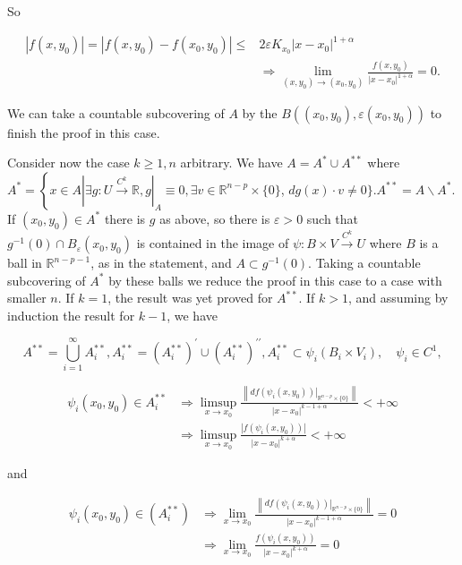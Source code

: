 \documentclass[10pt]{article}
\begin{document}
So

$$
\begin{aligned}
\left|f\left(x, y_{0}\right)\right|=\left|f\left(x, y_{0}\right)-f\left(x_{0}, y_{0}\right)\right| \leq & 2 \varepsilon K_{x_{0}}\left|x-x_{0}\right|^{1+\alpha} \\
& \Rightarrow \lim _{\left(x, y_{0}\right) \rightarrow\left(x_{0}, y_{0}\right)} \frac{f\left(x, y_{0}\right)}{\left|x-x_{0}\right|^{1+\alpha}}=0 .
\end{aligned}
$$

We can take a countable subcovering of $A$ by the $B\left(\left(x_{0}, y_{0}\right), \varepsilon\left(x_{0}, y_{0}\right)\right)$ to finish the proof in this case.

Consider now the case $k \geq 1, n$ arbitrary. We have $A=A^{*} \cup A^{* *}$ where $A^{*}=\left\{x \in A\left|\exists g: U \xrightarrow{C^{k}} \mathbb{R}, g\right|_{A} \equiv 0, \exists v \in \mathbb{R}^{n-p} \times\{0\}\right.$, $d g(x) \cdot v \neq 0\} . A^{* *}=A \backslash A^{*}$. If $\left(x_{0}, y_{0}\right) \in A^{*}$ there is $g$ as above, so there is $\varepsilon>0$ such that $g^{-1}(0) \cap B_{\varepsilon}\left(x_{0}, y_{0}\right)$ is contained in the image of $\psi: B \times V \xrightarrow{C^{k}} U$ where $B$ is a ball in $\mathbb{R}^{n-p-1}$, as in the statement, and $A \subset g^{-1}(0)$. Taking a countable subcovering of $A^{*}$ by these balls we reduce the proof in this case to a case with smaller $n$. If $k=1$, the result was yet proved for $A^{* *}$. If $k>1$, and assuming by induction the result for $k-1$, we have

$$
A^{* *}=\bigcup_{i=1}^{\infty} A_{i}^{* *}, A_{i}^{* *}=\left(A_{i}^{* *}\right)^{\prime} \cup\left(A_{i}^{* *}\right)^{\prime \prime}, A_{i}^{* *} \subset \psi_{i}\left(B_{i} \times V_{i}\right), \quad \psi_{i} \in C^{1},
$$

$$
\begin{aligned}
\psi_{i}\left(x_{0}, y_{0}\right) \in A_{i}^{* *} & \Rightarrow \limsup _{x \rightarrow x_{0}} \frac{\left\|\left.d f\left(\psi_{i}\left(x, y_{0}\right)\right)\right|_{\mathbb{R}^{n-p} \times\{0\}}\right\|}{\left|x-x_{0}\right|^{k-1+\alpha}}<+\infty \\
& \Rightarrow \limsup _{x \rightarrow x_{0}} \frac{\left|f\left(\psi_{i}\left(x, y_{0}\right)\right)\right|}{\left|x-x_{0}\right|^{k+\alpha}}<+\infty
\end{aligned}
$$

and

$$
\begin{aligned}
\psi_{i}\left(x_{0}, y_{0}\right) \in\left(A_{i}^{* *}\right) & \Rightarrow \lim _{x \rightarrow x_{0}} \frac{\left\|\left.d f\left(\psi_{i}\left(x, y_{0}\right)\right)\right|_{\mathbb{R}^{n-p} \times\{0\}}\right\|}{\left|x-x_{0}\right|^{k-1+\alpha}}=0 \\
& \Rightarrow \lim _{x \rightarrow x_{0}} \frac{f\left(\psi_{i}\left(x, y_{0}\right)\right)}{\left|x-x_{0}\right|^{k+\alpha}}=0
\end{aligned}
$$
\end{document}
